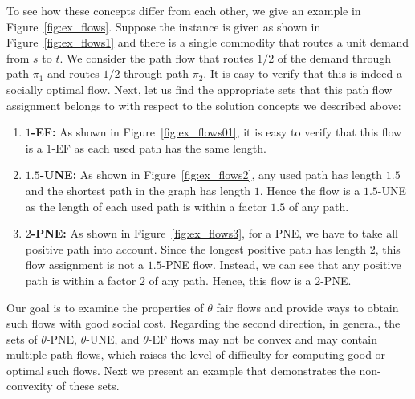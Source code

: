 To see how these concepts differ from each other, we give an example in Figure~\ref{fig:ex_flows}.  Suppose the instance is given as shown in Figure~\ref{fig:ex_flows1} and there is a single commodity that routes a unit demand  from $s$ to $t$.  We consider the path flow that routes $1/2$ of the demand through path $\pi_1$ and routes $1/2$ through path $\pi_2$.  It is easy to verify that this is indeed a socially optimal flow.  Next, let us find the appropriate sets that this path flow assignment belongs to with respect to the solution concepts we described above:
\begin{enumerate}
	\item \textbf{$1$-EF:} As shown in Figure~\ref{fig:ex_flows01}, it is easy to verify that this flow is a $1$-EF as each used path has the same length.
	\item \textbf{$1.5$-UNE:} As shown in Figure~\ref{fig:ex_flows2}, any used path has length $1.5$ and the shortest path in the graph has length $1$.  Hence the flow is a $1.5$-UNE as the length of each used path is within a factor $1.5$  of any path.
	\item \textbf{$2$-PNE:} As shown in Figure~\ref{fig:ex_flows3}, for a PNE, we have to take all positive path into account.  Since the longest positive path has length $2$, this flow assignment is not a $1.5$-PNE flow.  Instead, we can see that any positive path is within a factor $2$ of any path.  Hence, this flow is a $2$-PNE.
\end{enumerate}

 
Our goal is to examine the properties of $\theta$ fair flows and provide ways to obtain such flows with good social cost. Regarding the second direction,  in general, the sets of $\theta$-PNE, $\theta$-UNE, and $\theta$-EF flows may not be convex and may contain multiple path flows, which raises the level of difficulty for computing good or optimal such flows. Next we present an example that demonstrates the non-convexity of these sets.



